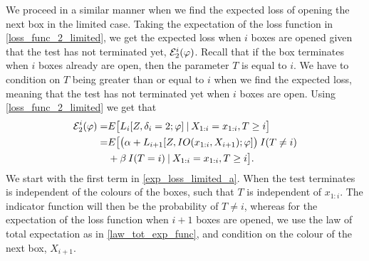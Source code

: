 We proceed in a similar manner when we find the expected loss of opening the next box in the limited case. Taking the expectation of the loss function in \eqref{loss_func_2_limited}, we get the expected loss when $i$ boxes are opened given that the test has not terminated yet, $\mathcal{E}^i_2(\varphi)$. Recall that if the box terminates when $i$ boxes already are open, then the parameter $T$ is equal to $i$. We have to condition on $T$ being greater than or equal to $i$ when we find the expected loss, meaning that the test has not terminated yet when $i$ boxes are open. Using \eqref{loss_func_2_limited} we get that
\begin{equation}
\label{exp_loss_limited_a}
    \begin{aligned}
        \mathcal{E}^i_{2}(\varphi) 
        = &E\big[L_i[Z,\delta_i=2;\varphi]\: | \: X_{1:i}=x_{1:i}, T\geq i\big] \\
        =& E\big[\big( \alpha + L_{i+1}[Z,IO(x_{1:i},X_{i+1});\varphi] \big) \: I(T\neq i) \\
        &+ \beta \: I(T=i) \: | \: X_{1:i}= x_{1:i}, T\geq i\big].
    \end{aligned}
\end{equation}
We start with the first term in \eqref{exp_loss_limited_a}. When the test terminates is independent of the colours of the boxes, such that $T$ is independent of $x_{1:i}$. The indicator function will then be the probability of $T\neq i$, whereas for the expectation of the loss function when $i+1$ boxes are opened, we use the law of total expectation as in \eqref{law_tot_exp_func}, and condition on the colour of the next box, $X_{i+1}$. 

